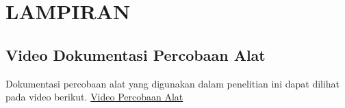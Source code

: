 \chapter{LAMPIRAN}

\section{Video Dokumentasi Percobaan Alat}
Dokumentasi percobaan alat yang digunakan dalam penelitian ini dapat dilihat pada video berikut.
\href{https://www.youtube.com/watch?v=DF5Xv9Hjd88}{Video Percobaan Alat}




